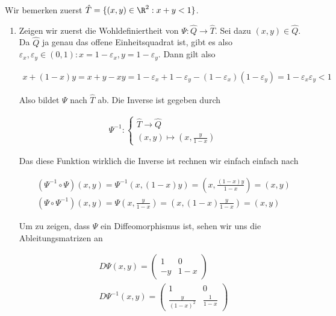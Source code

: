 \begin{solution}

Wir bemerken zuerst $\hat{T} = \{(x,y) \in \R^2: x + y < 1\}$.

\begin{enumerate}[label = \textbf{\alph*)}]
  \item Zeigen wir zuerst die Wohldefiniertheit von $\Psi: \hat{Q} \rightarrow \hat{T}$.
  Sei dazu $(x,y) \in \hat{Q}$. Da $\hat{Q}$ ja genau das offene Einheitsquadrat ist,
  gibt es also $\varepsilon_x, \varepsilon_y \in (0,1): x = 1 - \varepsilon_x, y = 1 -\varepsilon_y$. Dann gilt also

  \begin{align*}
    x + (1-x)y
    =
    x + y - xy
    =
    1 - \varepsilon_x + 1 - \varepsilon_y - (1 - \varepsilon_x)(1 - \varepsilon_y)
    =
    1 - \varepsilon_x \varepsilon_y
    <
    1
  \end{align*}

  Also bildet $\Psi$ nach $\hat{T}$ ab. Die Inverse ist gegeben durch

  \begin{align*}
    \Psi^{-1}: \begin{cases}
    \hat{T} \rightarrow \hat{Q} \\
    (x,y) \mapsto (x, \frac{y}{1-x})
    \end{cases}
  \end{align*}

  Das diese Funktion wirklich die Inverse ist rechnen wir einfach einfach nach

  \begin{align*}
    (\Psi^{-1} \circ \Psi)(x,y)
    =
    \Psi^{-1}(x,(1-x)y)
    =
    (x, \frac{(1-x)y}{1-x})
    =
    (x,y) \\
    (\Psi \circ \Psi^{-1})(x,y)
    =
    \Psi(x, \frac{y}{1-x})
    =
    (x,(1-x)\frac{y}{1-x})
    =
    (x,y)
  \end{align*}

  Um zu zeigen, dass $\Psi$ ein Diffeomorphismus ist, sehen wir uns die Ableitungsmatrizen an

  \begin{align*}
    D\Psi(x,y)
    =
    \begin{pmatrix}
      1 & 0 \\
      -y & 1-x
    \end{pmatrix} \\
    D\Psi^{-1}(x,y)
    =
    \begin{pmatrix}
      1 & 0 \\
      \frac{y}{(1-x)^2} & \frac{1}{1-x}
    \end{pmatrix}
  \end{align*}


\end{enumerate}
\end{solution}
